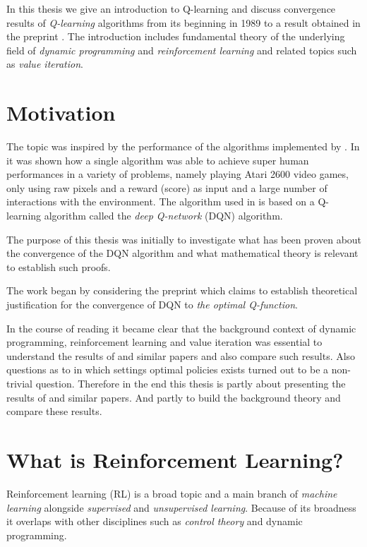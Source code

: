 In this thesis we give an introduction to Q-learning and discuss
convergence results of \emph{Q-learning} algorithms from its beginning in
1989  to a result obtained in the preprint .
The introduction includes fundamental theory of the underlying field of
\emph{dynamic programming} and \emph{reinforcement learning}
and related topics such as \emph{value iteration}.

\section{Motivation}
The topic was inspired by the performance of the algorithms
implemented by .
In  it was shown how a single algorithm was able to achieve super
human performances in a variety of problems, namely playing Atari 2600 video
games, only using raw pixels and a reward (score) as input and a large number of
interactions with the environment.
The algorithm used in  is based on a Q-learning
algorithm called the \emph{deep Q-network} (DQN) algorithm.

The purpose of this thesis was initially 
to investigate what has been proven
about the convergence of the DQN algorithm
and what mathematical theory is relevant to establish such proofs.

The work began by considering the preprint
 which claims to establish theoretical justification for
the convergence of DQN to \emph{the optimal Q-function}.

In the course of reading  it became clear that the background
context of dynamic programming, reinforcement learning and value iteration
was essential to understand the results of  and similar papers
and also compare such results.
Also questions as to in which settings optimal policies exists turned out
to be a non-trivial question.
Therefore in the end this thesis is partly about presenting the results of
 and similar papers.
And partly to build the background theory and compare these results.

\section{What is Reinforcement Learning?}

Reinforcement learning (RL) is a broad topic and a main branch of
\emph{machine learning} alongside \emph{supervised} and \emph{unsupervised
learning}. Because of its broadness it overlaps with other disciplines
such as \emph{control theory} and dynamic programming.

